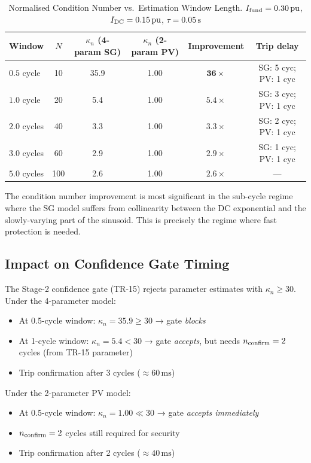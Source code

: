 \documentclass[11pt, a4paper]{article}
\newcommand{\pu}{\,\text{pu}}
\newcommand{\ms}{\,\text{ms}}
\newcommand{\kn}{\kappa_n}
\begin{document}
\begin{table}[!t]
\centering
\caption{Normalised Condition Number vs.\ Estimation Window Length.
$I_{\rm fund}=0.30\pu$, $I_{\rm DC}=0.15\pu$, $\tau=0.05\,\text{s}$}
\label{tab:kappa_window}
\renewcommand{\arraystretch}{1.12}
\begin{tabular}{lccccc}
\toprule
Window & $N$ & $\kn$ (4-param SG) & $\kn$ (2-param PV) & Improvement & Trip delay \\
\midrule
$0.5$ cycle & 10  & 35.9 & 1.00 & $\mathbf{36\times}$ & SG: 5 cyc; PV: 1 cyc \\
$1.0$ cycle & 20  & 5.4  & 1.00 & $5.4\times$ & SG: 3 cyc; PV: 1 cyc \\
$2.0$ cycles & 40 & 3.3  & 1.00 & $3.3\times$ & SG: 2 cyc; PV: 1 cyc \\
$3.0$ cycles & 60 & 2.9  & 1.00 & $2.9\times$ & SG: 1 cyc; PV: 1 cyc \\
$5.0$ cycles & 100 & 2.6 & 1.00 & $2.6\times$ & --- \\
\bottomrule
\end{tabular}
\end{table}

The condition number improvement is most significant in the sub-cycle regime
where the SG model suffers from collinearity between the DC exponential and the
slowly-varying part of the sinusoid.  This is precisely the regime where fast
protection is needed.

\subsection{Impact on Confidence Gate Timing}

The Stage-2 confidence gate (TR-15) rejects parameter estimates with
$\kn \geq 30$.  Under the 4-parameter model:
\begin{itemize}
  \item At 0.5-cycle window: $\kn = 35.9 \geq 30$ → gate \emph{blocks}
  \item At 1-cycle window: $\kn = 5.4 < 30$ → gate \emph{accepts}, but needs
    $n_{\rm confirm} = 2$ cycles (from TR-15 parameter)
  \item Trip confirmation after 3 cycles ($\approx 60\ms$)
\end{itemize}

Under the 2-parameter PV model:
\begin{itemize}
  \item At 0.5-cycle window: $\kn = 1.00 \ll 30$ → gate \emph{accepts immediately}
  \item $n_{\rm confirm} = 2$ cycles still required for security
  \item Trip confirmation after 2 cycles ($\approx 40\ms$)
\end{itemize}
\end{document}
